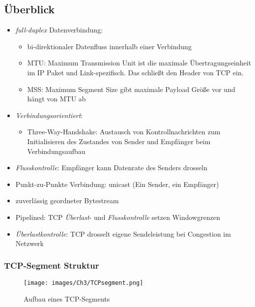 \subsection{Überblick}
\begin{itemize}
    \item \emph{full-duplex} Datenverbindung:
            \begin{itemize}
                \item bi-direktionaler Datenfluss innerhalb einer Verbindung
                \item MTU: Maximum Transmission Unit ist die maximale Übertragungseinheit im IP Paket und Link-spezifisch. Das schließt den Header von TCP ein.
                \item MSS: Maximum Segment Size gibt maximale Payload Größe vor und hängt von MTU ab
            \end{itemize}
    \item \emph{Verbindungsorientiert}:
            \begin{itemize}
                \item Three-Way-Handshake: Austausch von Kontrollnachrichten zum Initialisieren des Zustandes von Sender und Empfänger beim Verbindungsaufbau
            \end{itemize}
    \item \emph{Flusskontrolle}: Empfänger kann Datenrate des Senders drosseln
    \item Punkt-zu-Punkte Verbindung: unicast (Ein Sender, ein Empfänger)
    \item zuverlässig geordneter Bytestream
    \item Pipelined: TCP \emph{Überlast}- und \emph{Flusskontrolle} setzen Windowgrenzen
    \item \emph{Überlastkontrolle}: TCP drosselt eigene Sendeleistung bei Congestion im Netzwerk
\end{itemize}


\subsubsection{TCP-Segment Struktur}
\begin{figure}[H]
    \centering
    \texttt{[image: images/Ch3/TCPsegment.png]}
    \caption{Aufbau eines TCP-Segments}
    \label{Ch03-TCPsegment}
\end{figure}

